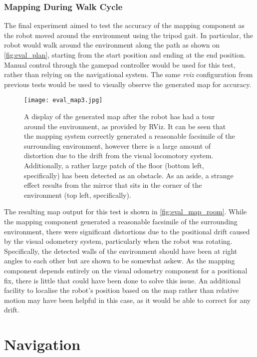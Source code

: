 \subsubsection{Mapping During Walk Cycle}

The final experiment aimed to test the accuracy of the mapping component as the robot moved around the environment using the tripod gait. In particular, the robot would walk around the environment along the path as shown on \autoref{fig:eval_plan}, starting from the start position and ending at the end position. Manual control through the gamepad controller would be used for this test, rather than relying on the navigational system. The same \emph{rviz} configuration from previous tests would be used to visually observe the generated map for accuracy.

\begin{figure}[h]
	\centering
	\texttt{[image: eval\_map3.jpg]}
	\caption{A display of the generated map after the robot has had a tour around the environment, as provided by RViz. It can be seen that the mapping system correctly generated a reasonable facsimile of the surrounding environment, however there is a large amount of distortion due to the drift from the visual locomotory system. Additionally, a rather large patch of the floor (bottom left, specifically) has been detected as an obstacle. As an aside, a strange effect results from the mirror that sits in the corner of the environment (top left, specifically).}
	\label{fig:eval_map_room}
\end{figure}

The resulting map output for this test is shown in \autoref{fig:eval_map_room}. While the mapping component generated a reasonable facsimile of the surrounding environment, there were significant distortions due to the positional drift caused by the visual odometery system, particularly when the robot was rotating. Specifically, the detected walls of the environment should have been at right angles to each other but are shown to be somewhat askew. As the mapping component depends entirely on the visual odometry component for a positional fix, there is little that could have been done to solve this issue. An additional facility to localise the robot's position based on the map rather than relative motion may have been helpful in this case, as it would be able to correct for any drift.

\section{Navigation}

